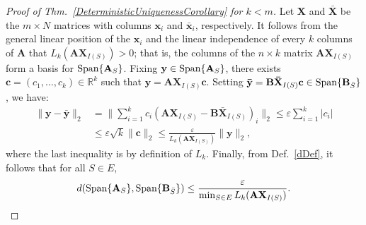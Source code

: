 \documentclass[9pt,twocolumn]{pnas-new}
\begin{document}
\begin{proof}[Proof of Thm.~\ref{DeterministicUniquenessCorollary} for $k < m$]
Let $\mathbf{X}$ and $\mathbf{\bar{X}}$ be the $m \times N$ matrices with columns $\mathbf{x}_i$ and $\mathbf{\bar x}_i$, respectively. It follows from the general linear position of the $\mathbf{x}_i$ and the linear independence of every $k$ columns of $\mathbf{A}$ that $L_k(\mathbf{AX}_{I(S)}) > 0$; that is, the columns of the $n \times k$ matrix $\mathbf{AX}_{I(S)}$ form a basis for $\text{\rm Span}\{\mathbf{A}_{S}\}$. Fixing $\mathbf{y} \in \text{\rm Span}\{\mathbf{A}_{S}\}$, there exists $\mathbf{c} = (c_1, \ldots, c_k) \in \mathbb{R}^k$ such that $\mathbf{y} = \mathbf{AX}_{I(S)}\mathbf{c}$. Setting \mbox{$\mathbf{\bar{y}} = \mathbf{B\bar{X}}_{I(S)}\mathbf{c} \in \text{\rm Span}\{\mathbf{B}_{\bar S}\}$}, we have:
\begin{align*}
\|\mathbf{y} - \mathbf{\bar{y}}\|_2 
&= \|\sum_{i=1}^k c_i(\mathbf{AX}_{I(S)} - \mathbf{B\bar{X}}_{I(S)})_i\|_2
\leq \varepsilon \sum_{i=1}^k |c_i| \\
&\leq \varepsilon \sqrt{k}  \|\mathbf{c}\|_2 
\leq \frac{\varepsilon}{L_k(\mathbf{AX}_{I(S)})} \|\mathbf{y}\|_2,
\end{align*}
where the last inequality is by definition of $L_k$. Finally, from Def.~\ref{dDef}, it follows that for all $S \in E$,
\begin{align}\label{rhs222}
d(\text{\rm Span}\{\mathbf{A}_S\}, \text{\rm Span}\{\mathbf{B}_{\bar S}\}) 
\leq \frac{\varepsilon}{ \min_{S \in E} L_k(\mathbf{AX}_{I(S)}) }.
\end{align}
\end{proof}

 
\end{document}
